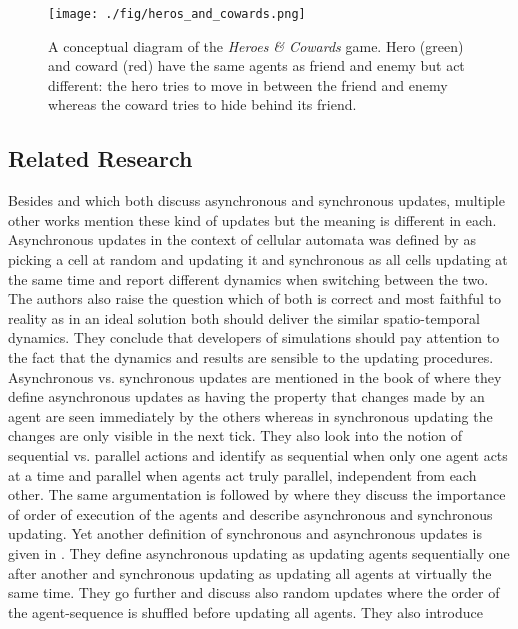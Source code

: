 \begin{figure}
	\centering
	\texttt{[image: ./fig/heros\_and\_cowards.png]}
	\caption{A conceptual diagram of the \textit{Heroes \& Cowards} game. Hero (green) and coward (red) have the same agents as friend and enemy but act different: the hero tries to move in between the friend and enemy whereas the coward tries to hide behind its friend.}
	\label{fig:heros_and_cowards}
\end{figure}

\subsection{Related Research}
Besides \cite{nowak_evolutionary_1992} and \cite{huberman_evolutionary_1993} which both discuss asynchronous and synchronous updates, multiple other works mention these kind of updates but the meaning is different in each.
Asynchronous updates in the context of cellular automata was defined by \cite{bersini_asynchrony_1994} as picking a cell at random and updating it and synchronous as all cells updating at the same time and report different dynamics when switching between the two. The authors also raise the question which of both is correct and most faithful to reality as in an ideal solution both should deliver the similar spatio-temporal dynamics. They conclude that developers of simulations should pay attention to the fact that the dynamics and results are sensible to the updating procedures.
Asynchronous vs. synchronous updates are mentioned in the book of \cite{wilensky_introduction_2015} where they define asynchronous updates as having the property that changes made by an agent are seen immediately by the others whereas in synchronous updating the changes are only visible in the next tick. They also look into the notion of sequential vs. parallel actions and identify as sequential when only one agent acts at a time and parallel when agents act truly parallel, independent from each other. The same argumentation is followed by \cite{railsback_agent-based_2011} where they  discuss the importance of order of execution of the agents and describe asynchronous and synchronous updating.
Yet another definition of synchronous and asynchronous updates is given in \cite{page_incentives_1997}. They define asynchronous updating as updating agents sequentially one after another and synchronous updating as updating all agents at virtually the same time. They go further and discuss also random updates where the order of the agent-sequence is shuffled before updating all agents. They also introduce 
